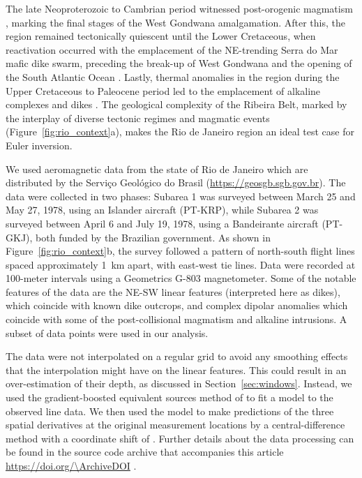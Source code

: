 The late Neoproterozoic to Cambrian period witnessed post-orogenic magmatism
\citep[\textit{e.g.,}][]{Valeriano2011}, marking the final stages of the West
Gondwana amalgamation. After this, the region remained tectonically quiescent
until the Lower Cretaceous, when reactivation occurred with the emplacement of
the NE-trending Serra do Mar mafic dike swarm, preceding the break-up of West
Gondwana and the opening of the South Atlantic Ocean \citep{Almeida2013}.
Lastly, thermal anomalies in the region during the Upper Cretaceous to
Paleocene period led to the emplacement of alkaline complexes and dikes
\citep{Thompson1998}.
The geological complexity of the Ribeira Belt, marked by the interplay of diverse tectonic
regimes and magmatic events (Figure~\ref{fig:rio_context}a), makes the Rio de Janeiro
region an ideal test case for Euler inversion.

We used aeromagnetic data from the state of Rio de Janeiro which are distributed by the Serviço Geológico do Brasil (\url{https://geosgb.sgb.gov.br}).
The data were collected in two phases: Subarea 1 was surveyed between March 25 and May 27, 1978, using
an Islander aircraft (PT-KRP), while Subarea 2 was surveyed between April 6 and
July 19, 1978, using a Bandeirante aircraft (PT-GKJ), both funded by the
Brazilian government.
As shown in Figure~\ref{fig:rio_context}b, the survey followed a pattern of north-south flight lines spaced approximately \qty{1}{\km} apart, with east-west tie lines.
Data were recorded at 100-meter intervals using a Geometrics G-803 magnetometer.
Some of the notable features of the data are the NE-SW linear features (interpreted here as dikes), which coincide with known dike outcrops, and complex dipolar anomalies which coincide with some of the post-collisional magmatism and alkaline intrusions.
A subset of \RioNData{} data points were used in our analysis.

The data were not interpolated on a regular grid to avoid any smoothing effects that the interpolation might have on the linear features.
This could result in an over-estimation of their depth, as discussed in Section~\ref{sec:windows}.
Instead, we used the gradient-boosted equivalent sources method of \citet{Soler2021} to fit a model to the observed line data.
We then used the model to make predictions of the three spatial derivatives at the original measurement locations by a central-difference method with a coordinate shift of \RioDerivSpacing{}.
Further details about the data processing can be found in the source code archive that accompanies this article \url{https://doi.org/\ArchiveDOI} \citep{figshare}.

